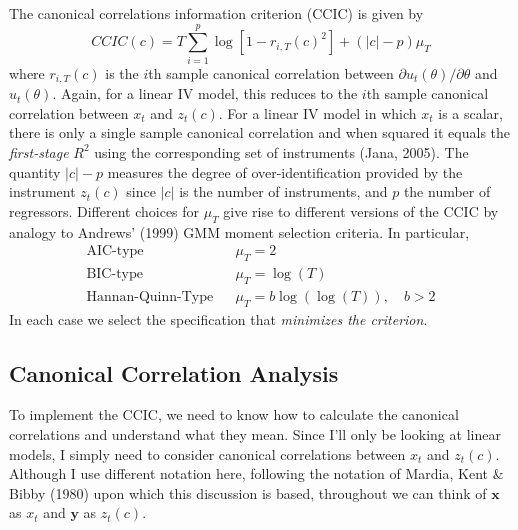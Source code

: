 \documentclass[12pt]{article}
\theoremstyle{definition}
\begin{document}
The canonical correlations information criterion (CCIC) is given by
  $$CCIC(c) = T\sum_{i=1}^p \log\left[1 - r_{i,T}(c)^2 \right] + (|c| - p)\mu_T$$
where $r_{i,T}(c)$ is the $i$th sample canonical correlation between $\partial u_t(\theta)/\partial \theta$ and $u_t(\theta)$. Again, for a linear IV model, this reduces to the $i$th sample canonical correlation between $x_t$ and $z_t(c)$. For a linear IV model in which $x_t$ is a scalar, there is only a single sample canonical correlation and when squared it equals the \emph{first-stage} $R^2$ using the corresponding set of instruments (Jana, 2005). The quantity $|c| - p$ measures the degree of over-identification provided by the instrument $z_t(c)$ since $|c|$ is the number of instruments, and $p$ the number of regressors. Different choices for $\mu_T$ give rise to different versions of the CCIC by analogy to Andrews' (1999) GMM moment selection criteria. In particular, 
  \begin{eqnarray*}
    \mbox{AIC-type} && \mu_T = 2\\
    \mbox{BIC-type} && \mu_T = \log(T)\\
    \mbox{Hannan-Quinn-Type} && \mu_T = b \log(\log(T)), \quad b > 2
  \end{eqnarray*}
In each case we select the specification that \emph{minimizes the criterion}.

\subsection{Canonical Correlation Analysis} 
To implement the CCIC, we need to know how to calculate the canonical correlations and understand what they mean. Since I'll only be looking at linear models, I simply need to consider canonical correlations between $x_t$ and $z_t(c)$. Although I use different notation here, following the notation of Mardia, Kent \& Bibby (1980) upon which this discussion is based, throughout we can think of $\mathbf{x}$ as $x_t$ and $\mathbf{y}$ as $z_t(c)$.
\end{document}
